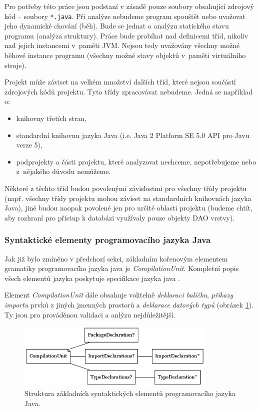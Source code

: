 Pro potřeby této práce jsou podstaní v zásadě pouze soubory obsahující zdrojový kód -- soubory \verb+*.java+. Při analýze nebudeme program spouštět nebo uvažovat jeho dynamické chování (běh). Bude se jednat o analýzu statického stavu programu (analýza struktury). Práce bude probíhat nad definicemi tříd, nikoliv nad jejich instancemi v~paměti JVM. Nejsou tedy uvažovány všechny možné běhové instance programu (všechny možné stavy objektů v~paměti virtuálního stroje).

Projekt může záviset na velkém množství dalších tříd, které nejsou součástí zdrojových kódů projektu. Tyto třídy zpracovávat nebudeme. Jedná se například o:

\begin{itemize}
\item knihovny třetích stran,
\item standardní knihovnu jazyka Java (i.e. Java 2 Platform SE 5.0 API pro Javu verze 5),
\item podprojekty a části projektu, které analyzovat nechceme, nepotřebujeme nebo z~nějakého důvodu nemůžeme.
\end{itemize}

Některé z těchto tříd budou povolenými závislostmi pro všechny třídy projektu (např. všechny třídy projektu mohou záviset na standardních knihovnách jazyka Java), jiné budou naopak povolené jen pro určité oblasti projektu (budeme chtít, aby rozhraní pro přístup k databázi využívaly pouze objekty DAO vrstvy).

\subsubsection{Syntaktické elementy programovacího jazyka Java}
\label{analysis-java_grammar_elements}
Jak již bylo zmíněno v předchozí sekci, základním kořenovým elementem gramatiky programovacího jazyka java je \emph{CompilationUnit}. Kompletní popis všech elementů jazyka poskytuje specifikace jazyka java \cite{Gosling:2005:JLS:1036643}.

Element \emph{CompilationUnit} dále obsahuje volitelně \emph{deklaraci balíčku}, \emph{příkazy importu} prvků z jiných jmenných prostorů a \emph{deklarace datových typů} (obrázek \ref{toplevel_elements}). Ty jsou pro prováděnou validaci a anlýzu nejdůležitější.

\begin{figure}[h!]
  \centering
  \includegraphics[width=0.85\textwidth]{./graphs/java_top_elements.png}
  \caption{Struktura základních syntaktických elementů programovacího jazyka Java.\label{toplevel_elements}}
\end{figure}

